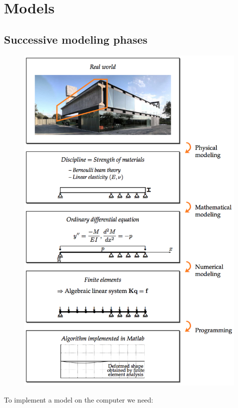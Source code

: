 
\chapter{Models}
	\section{Successive modeling phases}
		
		\begin{figure}
		\vspace{-5mm}	
		\includegraphics[scale=0.35]{ch2/1}
		\end{figure}		
		To implement a model on the computer we need:		
